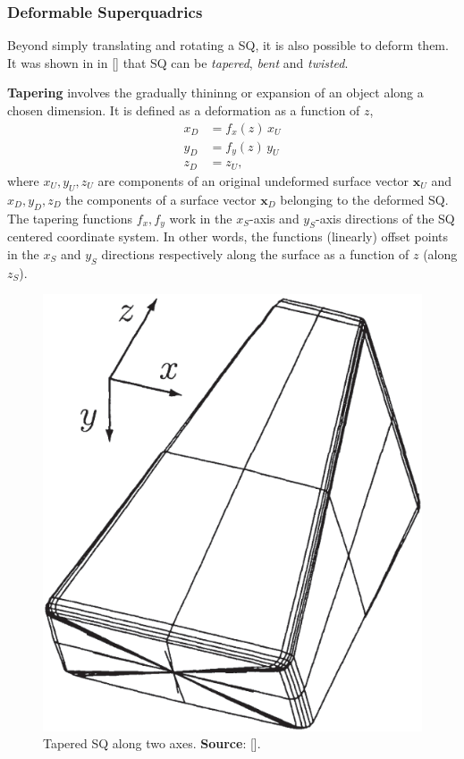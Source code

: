 \subsubsection*{Deformable Superquadrics}
\label{subsubsec:SQDeform}

Beyond simply translating and rotating a \gls{SQ}, it is also possible to deform them. It was shown in in [\citeauthor{Jaklic2000}] that \gls{SQ} can be \textit{tapered}, \textit{bent} and \textit{twisted}. 

\textbf{Tapering} involves the gradually thininng or expansion of an object along a chosen dimension. It is defined as a deformation as a function of $z$,
\begin{align}
x_D&= f_x(z)\,x_U \\
y_D&= f_y(z)\,y_U \\
z_D&= z_U,
\end{align}
where $x_U,y_U,z_U$ are components of an original undeformed surface vector $\textbf{x}_U$ and $x_D, y_D, z_D$ the components of a surface vector $\textbf{x}_D$ belonging to the deformed \gls{SQ}. The tapering functions $f_x, f_y$ work in the $x_S$-axis and $y_S$-axis directions of the \gls{SQ} centered coordinate system. In other words, the functions (linearly) offset points in the $x_S$ and $y_S$ directions respectively along the surface as a function of $z$ (along $z_S$). 

\begin{figure}[h]
	\centering
	\includegraphics[width=0.15\textheight]{import/SQ_tapered}
	\caption{Tapered SQ along two axes. \textbf{Source}: [\citeauthor{Jaklic2000}].}
	\label{fig:SQ_tapered}
\end{figure}


